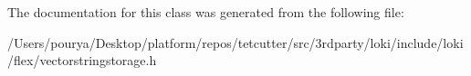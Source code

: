 The documentation for this class was generated from the following file\+:\begin{DoxyCompactItemize}
\item 
/\+Users/pourya/\+Desktop/platform/repos/tetcutter/src/3rdparty/loki/include/loki/flex/vectorstringstorage.\+h\end{DoxyCompactItemize}
